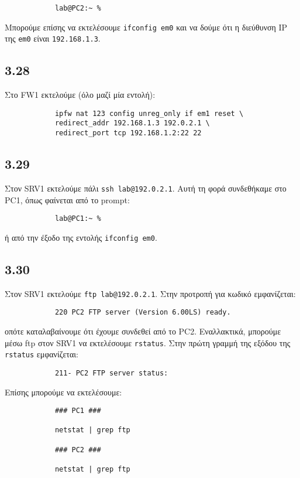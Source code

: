 \documentclass[a4paper, 12pt]{article}
\begin{document}
		\begin{verbatim}
			lab@PC2:~ %
		\end{verbatim}
		
		Μπορούμε επίσης να εκτελέσουμε \verb|ifconfig em0| και να δούμε ότι η διεύθυνση IP της \verb|em0| είναι \verb|192.168.1.3|.

	\subsection*{3.28}
		Στο FW1 εκτελούμε (όλο μαζί μία εντολή):
		
		\begin{verbatim}
			ipfw nat 123 config unreg_only if em1 reset \ 
			redirect_addr 192.168.1.3 192.0.2.1 \
			redirect_port tcp 192.168.1.2:22 22 
		\end{verbatim}

	\subsection*{3.29}
		Στον SRV1 εκτελούμε πάλι \verb|ssh lab@192.0.2.1|. Αυτή τη φορά συνδεθήκαμε στο PC1, όπως φαίνεται από το prompt:
		
		\begin{verbatim}
			lab@PC1:~ %
		\end{verbatim}
		
		ή από την έξοδο της εντολής \verb|ifconfig em0|.

	\subsection*{3.30}
		Στον SRV1 εκτελούμε \verb|ftp lab@192.0.2.1|. Στην προτροπή για κωδικό εμφανίζεται:
		
		\begin{verbatim}
			220 PC2 FTP server (Version 6.00LS) ready.
		\end{verbatim} 
		
		οπότε καταλαβαίνουμε ότι έχουμε συνδεθεί από το PC2. Εναλλακτικά, μπορούμε μέσω ftp στον SRV1 να εκτελέσουμε \verb|rstatus|. Στην πρώτη γραμμή της εξόδου της \verb|rstatus| εμφανίζεται:
		
		\begin{verbatim}
			211- PC2 FTP server status:
		\end{verbatim}
		
		Επίσης μπορούμε να εκτελέσουμε:
		
		\begin{verbatim}
			### PC1 ###
			
			netstat | grep ftp
			
			### PC2 ###
			
			netstat | grep ftp
		\end{verbatim}
		
\end{document}
